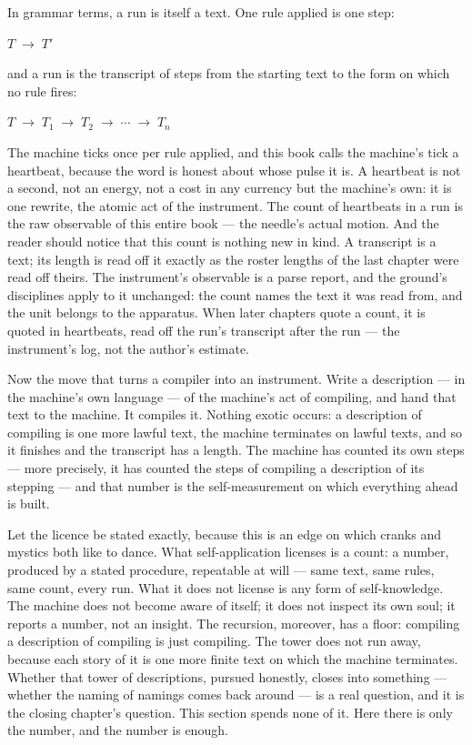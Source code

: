 In grammar terms, a run is itself a text. One rule applied is one step:

\begin{center}
$T \;\longrightarrow\; T'$
\end{center}

and a run is the transcript of steps from the starting text to the form on which no
rule fires:

\begin{center}
$T \;\longrightarrow\; T_1 \;\longrightarrow\; T_2 \;\longrightarrow\; \cdots \;\longrightarrow\; T_n$
\end{center}

The machine ticks once per rule applied, and this book calls the machine's tick a
heartbeat, because the word is honest about whose pulse it is. A heartbeat is not a
second, not an energy, not a cost in any currency but the machine's own: it is one
rewrite, the atomic act of the instrument. The count of heartbeats in a run is the raw
observable of this entire book --- the needle's actual motion. And the reader should
notice that this count is nothing new in kind. A transcript is a text; its length is
read off it exactly as the roster lengths of the last chapter were read off theirs. The
instrument's observable is a parse report, and the ground's disciplines apply to it
unchanged: the count names the text it was read from, and the unit belongs to the
apparatus. When later chapters quote a count, it is quoted in heartbeats, read off the
run's transcript after the run --- the instrument's log, not the author's estimate.

Now the move that turns a compiler into an instrument. Write a description --- in the
machine's own language --- of the machine's act of compiling, and hand that text to the
machine. It compiles it. Nothing exotic occurs: a description of compiling is one more
lawful text, the machine terminates on lawful texts, and so it finishes and the
transcript has a length. The machine has counted its own steps --- more precisely, it
has counted the steps of compiling a description of its stepping --- and that number is
the self-measurement on which everything ahead is built.

Let the licence be stated exactly, because this is an edge on which cranks and mystics
both like to dance. What self-application licenses is a count: a number, produced by a
stated procedure, repeatable at will --- same text, same rules, same count, every run.
What it does not license is any form of self-knowledge. The machine does not become
aware of itself; it does not inspect its own soul; it reports a number, not an insight.
The recursion, moreover, has a floor: compiling a description of compiling is just
compiling. The tower does not run away, because each story of it is one more finite
text on which the machine terminates. Whether that tower of descriptions, pursued
honestly, closes into something --- whether the naming of namings comes back around ---
is a real question, and it is the closing chapter's question. This section spends none
of it. Here there is only the number, and the number is enough.

